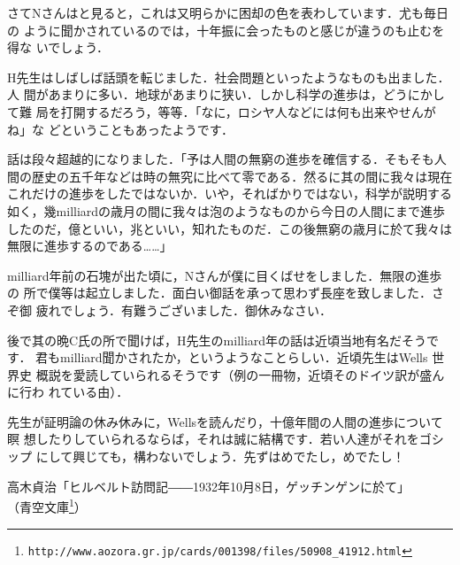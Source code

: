 \documentclass[20pt]{ltjsarticle}
\begin{document}
さてNさんはと見ると，これは又明らかに困却の色を表わしています．尤も毎日の
ように聞かされているのでは，十年振に会ったものと感じが違うのも止むを得な
いでしょう．

H先生はしばしば話頭を転じました．社会問題といったようなものも出ました．人
間があまりに多い．地球があまりに狭い．しかし科学の進歩は，どうにかして難
局を打開するだろう，等等．「なに，ロシヤ人などには何も出来やせんがね」な
どということもあったようです．

話は段々超越的になりました．「予は人間の無窮の進歩を確信する．そもそも人
間の歴史の五千年などは時の無究に比べて零である．然るに其の間に我々は現在
これだけの進歩をしたではないか．いや，そればかりではない，科学が説明する
如く，幾milliardの歳月の間に我々は泡のようなものから今日の人間にまで進歩
したのだ，億といい，兆といい，知れたものだ．この後無窮の歳月に於て我々は
無限に進歩するのである……」

milliard年前の石塊が出た頃に，Nさんが僕に目くばせをしました．無限の進歩の
所で僕等は起立しました．面白い御話を承って思わず長座を致しました．さぞ御
疲れでしょう．有難うございました．御休みなさい．

後で其の晩C氏の所で聞けば，H先生のmilliard年の話は近頃当地有名だそうです．
君もmilliard聞かされたか，というようなことらしい．近頃先生はWells 世界史
概説を愛読していられるそうです（例の一冊物，近頃そのドイツ訳が盛んに行わ
れている由）．

先生が証明論の休み休みに，Wellsを読んだり，十億年間の人間の進歩について瞑
想したりしていられるならば，それは誠に結構です．若い人達がそれをゴシップ
にして興じても，構わないでしょう．先ずはめでたし，めでたし！


\raggedleft 高木貞治「ヒルベルト訪問記――1932年10月8日，ゲッチンゲンに於て」\\
（青空文庫\footnote{\verb+http://www.aozora.gr.jp/cards/001398/files/50908_41912.html+}）
\end{document}
